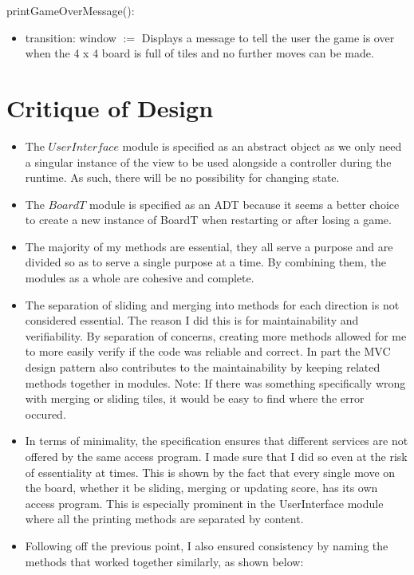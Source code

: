 \documentclass[12pt]{article}
\begin{document}
\noindent printGameOverMessage():
\begin{itemize}
\item transition: window $:=$ Displays a message to tell the user the game is over when the 4 x 4 board is full of tiles and no further moves can be made.
\end{itemize}
\newpage

\section* {Critique of Design}
\begin {itemize}
    \item The $UserInterface$ module is specified as an abstract object as we only need a singular instance of the view to be used alongside a controller during the runtime. As such, there will be no possibility for changing state. 
    \item The $BoardT$ module is specified as an ADT because it seems a better choice to create a new instance of BoardT when restarting or after losing a game.
    \item The majority of my methods are essential, they all serve a purpose and are divided so as to serve a single purpose at a time. By combining them, the modules as a whole are cohesive and complete.
    \item The separation of sliding and merging into methods for each direction is not considered essential. The reason I did this is for maintainability and verifiability. By separation of concerns, creating more methods allowed for me to more easily verify if the code was reliable and correct. In part the MVC design pattern also contributes to the maintainability by keeping related methods together in modules. \newline
    Note: If there was something specifically wrong with merging or sliding tiles, it would be easy to find where the error occured. 
    \item In terms of minimality, the specification ensures that different services are not offered by the same access program. I made sure that I did so even at the risk of essentiality at times. This is shown by the fact that every single move on the board, whether it be sliding, merging or updating score, has its own access program. This is especially prominent in the UserInterface module where all the printing methods are separated by content. 
    \item Following off the previous point, I also ensured consistency by naming the methods that worked together similarly, as shown below:

\end{itemize}
\end{document}
